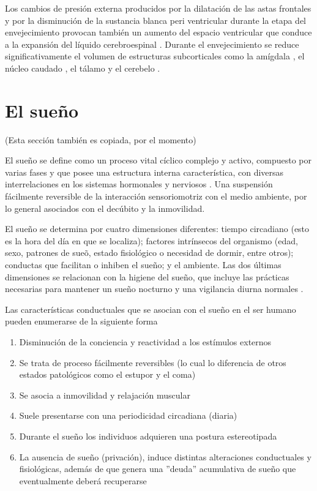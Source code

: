 Los cambios de presi\'on externa producidos por la dilataci\'on de las astas frontales y por la 
disminuci\'on de la sustancia blanca peri ventricular durante la etapa del envejecimiento 
provocan tambi\'en un aumento del espacio ventricular que conduce a la expansi\'on del l\'iquido 
cerebroespinal \cite{Hita14,Raz05}.
Durante el envejecimiento se reduce significativamente el volumen de estructuras subcorticales 
como la am\'igdala \cite{Allen05}, el n\'ucleo caudado \cite{Raz05}, el t\'alamo 
\cite{CarrilloMora} y el cerebelo \cite{Hita14}.


\section{El sue\~no}

(Esta secci\'on tambi\'en es copiada, por el momento)

El sue\~no se define como un proceso vital c\'iclico complejo y activo, compuesto por varias 
fases y que posee una estructura interna caracter\'istica, con diversas interrelaciones en los 
sistemas hormonales y nerviosos \cite{FernandezConde07}. Una suspensi\'on f\'acilmente reversible 
de la interacci\'on sensoriomotriz con el medio ambiente, por lo general asociados con el 
dec\'ubito y la inmovilidad.

El sue\~no se determina por cuatro dimensiones diferentes: tiempo circadiano (esto es la hora 
del d\'ia en que se localiza); factores intr\'insecos del organismo (edad, sexo, patrones de 
sue\~o, estado fisiol\'ogico o necesidad de dormir, entre otros); conductas que facilitan o 
inhiben el sue\~no; y el ambiente. Las dos \'ultimas dimensiones se relacionan con la higiene 
del sueño, que incluye las pr\'acticas necesarias para mantener un sue\~no nocturno y una 
vigilancia diurna normales \cite{Sierra02}.

Las caracter\'isticas conductuales que se asocian con el sue\~no en el ser humano pueden 
enumerarse de la siguiente forma\cite{CarrilloMora} 
\begin{enumerate}
\item Disminuci\'on de la conciencia y reactividad a los est\'imulos externos
\item Se trata de proceso f\'acilmente reversibles (lo cual lo diferencia de otros estados 
patol\'ogicos como el estupor y el coma)
\item Se asocia a inmovilidad y relajaci\'on muscular
\item Suele presentarse con una periodicidad circadiana (diaria)
\item Durante el sue\~no los individuos adquieren una postura estereotipada
\item La ausencia de sue\~no (privaci\'on), induce distintas alteraciones conductuales y 
fisiol\'ogicas, adem\'as de que genera una ''deuda'' acumulativa de sueño que eventualmente 
deber\'a recuperarse 
\end{enumerate}

